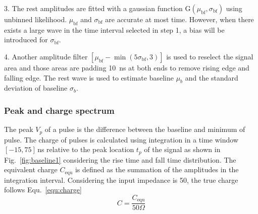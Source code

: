 3. The rest amplitudes are fitted with a gaussian function G$(\mu_{\mathrm{bf}},\sigma_{\mathrm{bf}})$ using unbinned likelihood. $\mu_{\mathrm{bf}}$ and $\sigma_{\mathrm{bf}}$ are accurate at most time. However, when there exists a large wave in the time interval selected in step 1, a bias will be introduced for $\sigma_{\mathrm{bf}}$.

4. Another amplitude filter $[\mu_{\mathrm{bf}}-\min(5\sigma_{\mathrm{bf}},3)]$ is used to reselect the signal area and those areas are padding \SI{10}{ns} at both ends to remove rising edge and falling edge. The rest wave is used to estimate baseline $\mu_b$ and the standard deviation of baseline $\sigma_b$.

\subsubsection{Peak and charge spectrum}
\label{sec:noisepeak}

The peak $V_p$ of a pulse is the difference between the baseline and minimum of pulse. The charge of pulses is calculated using integration in a time window $[-15, 75]$\,ns relative to the peak location $t_p$ of the signal as shown in Fig.~\ref{fig:baseline1} considering the rise time and fall time distribution. The equivalent charge $C_{\mathrm{equ}}$ is defined as the summation of the amplitudes in the integration interval. Considering the input impedance is \SI{50}{\Omega}, the true charge follows Equ.~\eqref{equ:charge} 
\begin{equation}
    \label{equ:charge}
    C = \frac{C_{\mathrm{equ}}}{50 \Omega}
\end{equation}

